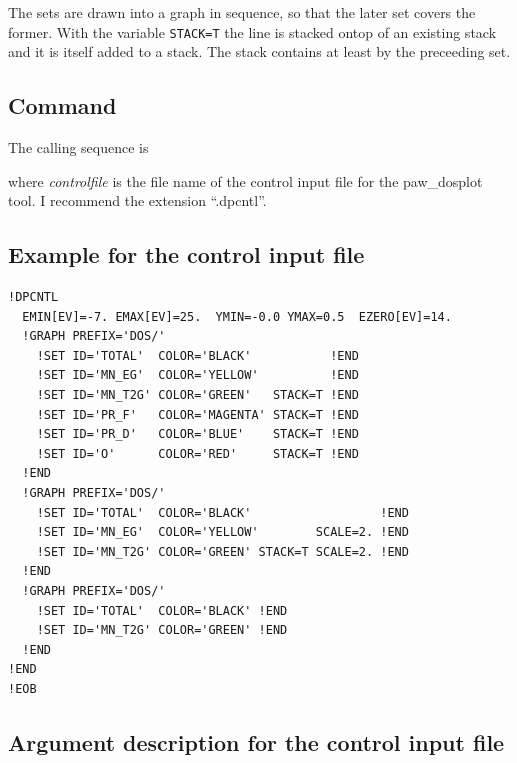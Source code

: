 \documentclass[final,12pt]{article}
\begin{document}
{{{{{{The sets are drawn into a graph in sequence, so that the later set
covers the former. With the variable \texttt{STACK=T} the line is
stacked ontop of an existing stack and it is itself added to a
stack. The stack contains at least by the preceeding set.


\subsection{Command}

The calling sequence is

\bigskip{}\bigskip

\noindent
where {\it controlfile} is the file name of the control input file for
the paw\_dosplot tool. I recommend the extension ``.dpcntl''.




\subsection{Example for the control input file}

\begin{verbatim}
!DPCNTL
  EMIN[EV]=-7. EMAX[EV]=25.  YMIN=-0.0 YMAX=0.5  EZERO[EV]=14.
  !GRAPH PREFIX='DOS/'
    !SET ID='TOTAL'  COLOR='BLACK'           !END
    !SET ID='MN_EG'  COLOR='YELLOW'          !END
    !SET ID='MN_T2G' COLOR='GREEN'   STACK=T !END
    !SET ID='PR_F'   COLOR='MAGENTA' STACK=T !END
    !SET ID='PR_D'   COLOR='BLUE'    STACK=T !END
    !SET ID='O'      COLOR='RED'     STACK=T !END
  !END
  !GRAPH PREFIX='DOS/' 
    !SET ID='TOTAL'  COLOR='BLACK'                  !END
    !SET ID='MN_EG'  COLOR='YELLOW'        SCALE=2. !END
    !SET ID='MN_T2G' COLOR='GREEN' STACK=T SCALE=2. !END
  !END
  !GRAPH PREFIX='DOS/'
    !SET ID='TOTAL'  COLOR='BLACK' !END
    !SET ID='MN_T2G' COLOR='GREEN' !END
  !END
!END
!EOB
\end{verbatim}

\newpage
\subsection{Argument description for the control input file}

}}}}}}
\end{document}
